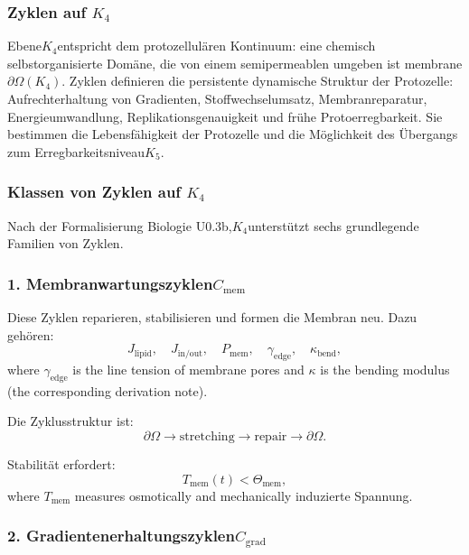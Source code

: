 
\subsubsection{Zyklen auf \texorpdfstring{$K_4$}{K_4}}
\label{sec:cycles-k4}

Ebene$K_4$entspricht dem protozellulären Kontinuum:
eine chemisch selbstorganisierte Domäne, die von einem semipermeablen umgeben ist
membrane $\partial\Omega(K_4)$.
Zyklen definieren die persistente dynamische Struktur der Protozelle:
Aufrechterhaltung von Gradienten, Stoffwechselumsatz, Membranreparatur,
Energieumwandlung, Replikationsgenauigkeit und frühe Protoerregbarkeit.
Sie bestimmen die Lebensfähigkeit der Protozelle und die Möglichkeit
des Übergangs zum Erregbarkeitsniveau$K_5$.

\subsubsection{Klassen von Zyklen auf \texorpdfstring{$K_4$}{K_4}}

Nach der Formalisierung Biologie U0.3b,$K_4$unterstützt sechs
grundlegende Familien von Zyklen.

\subsubsection{1. Membranwartungszyklen$C_{\mathrm{mem}}$}

Diese Zyklen reparieren, stabilisieren und formen die Membran neu.
Dazu gehören:
\[
  J_{\mathrm{lipid}},\quad
  J_{\mathrm{in/out}},\quad
  P_{\mathrm{mem}},\quad
  \gamma_{\mathrm{edge}},\quad
  \kappa_{\mathrm{bend}},
\]
where $\gamma_{\mathrm{edge}}$ is the line tension of membrane pores
and $\kappa$ is the bending modulus (the corresponding derivation note).

Die Zyklusstruktur ist:
\[
  \partial\Omega \to
  \mathrm{stretching} \to
  \mathrm{repair} \to
  \partial\Omega.
\]

Stabilität erfordert:
\[
  T_{\mathrm{mem}}(t) < \Theta_{\mathrm{mem}},
\]
where $T_{\mathrm{mem}}$ measures osmotically and mechanically
induzierte Spannung.

\subsubsection{2. Gradientenerhaltungszyklen$C_{\mathrm{grad}}$}

